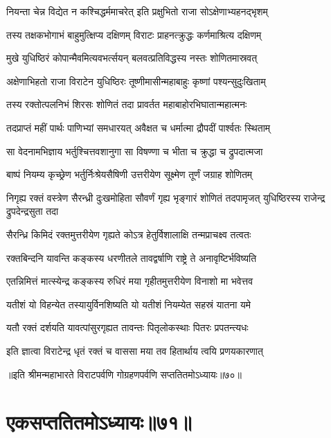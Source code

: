\twolineshloka
{नियन्ता चेन्न विद्येत न कश्चिद्धर्ममाचरेत्}
{इति प्रक्षुभितो राजा सोऽक्षेणाभ्यहनद्भृशम्}


\twolineshloka
{तस्य तक्षकभोगाभं बाहुमुत्क्षिप्य दक्षिणम्}
{विराटः प्राहनत्क्रुद्धः कर्णमाश्रित्य दक्षिणम्}


\twolineshloka
{मुखे युधिष्ठिरं कोपान्मैवमित्यवभर्त्सयन्}
{बलवत्प्रतिविद्धस्य नस्तः शोणितमास्रवत्}


\twolineshloka
{अक्षेणाभिहतो राजा विराटेन युधिष्ठिरः}
{तूष्णीमासीन्महाबाहुः कृष्णां पश्यन्सुदुःखिताम्}


\twolineshloka
{तस्य रक्तोत्पलनिभं शिरसः शोणितं तदा}
{प्रावर्तत महाबाहोरभिघातान्महात्मनः}


\twolineshloka
{तदप्राप्तं महीं पार्थः पाणिभ्यां समधारयत्}
{अवैक्षत च धर्मात्मा द्रौपदीं पार्श्वतः स्थिताम्}


\twolineshloka
{सा वेदनामभिज्ञाय भर्तुश्चित्तवशानुगा}
{सा विषण्णा च भीता च क्रुद्धा च द्रुपदात्मजा}


\twolineshloka
{बाष्पं नियम्य कृच्छ्रेण भर्तुर्निःश्रेयसैषिणी}
{उत्तरीयेण सूक्ष्मेण तूर्णं जग्राह शोणितम्}


\threelineshloka
{निगृह्य रक्तं वस्त्रेण सैरन्ध्री दुःखमोहिता}
{सौवर्णं गृह्य भृङ्गारं शोणितं तदपामृजत्}
{युधिष्ठिरस्य राजेन्द्र द्रुपदेन्द्रसुता तदा}




\twolineshloka
{सैरन्ध्रि किमिदं रक्तमुत्तरीयेण गृह्यते}
{कोऽत्र हेतुर्विशालाक्षि तन्मप्राचक्ष्व तत्वतः}




\twolineshloka
{रक्तबिन्दनि यावन्ति कङ्कस्य धरणीतले}
{तावद्वर्षाणि राष्ट्रे ते अनावृष्टिर्भविष्यति}


\twolineshloka
{एतन्निमित्तं मात्स्येन्द्र कङ्कस्य रुधिरं मया}
{गृहीतमुत्तरीयेण विनाशो मा भवेत्तव}


\twolineshloka
{यतीशं यो विहन्येत तस्यायुर्विनशिष्यति}
{यो यतीशं नियम्येत सहस्रं यातना यमे}


\twolineshloka
{यतौ रक्तं दर्शयति यावत्पांसुरगृह्यत}
{तावन्तः पितृलोकस्थाः पितरः प्रपतन्त्यधः}


\twolineshloka
{इति ज्ञात्वा विराटेन्द्र धृतं रक्तं च वाससा}
{मया तव हितार्थाय त्वयि प्रणयकारणात्}

॥इति श्रीमन्महाभारते विराटपर्वणि गोग्रहणपर्वणि सप्ततितमोऽध्यायः॥७०॥

\chapter{एकसप्ततितमोऽध्यायः॥७१॥}

